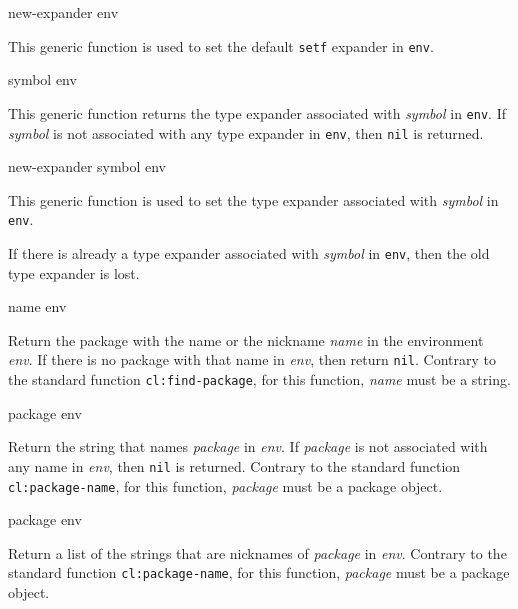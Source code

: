  {new-expander env}

This generic function is used to set the default \texttt{setf}
expander in \texttt{env}.

 {symbol env}

This generic function returns the type expander associated with
\textit{symbol} in \texttt{env}.  If \textit{symbol} is not associated
with any type expander in \texttt{env}, then \texttt{nil} is returned.

 {new-expander symbol env}

This generic function is used to set the type expander associated
with \textit{symbol} in \texttt{env}.

If there is already a type expander associated with \textit{symbol} in
\texttt{env}, then the old type expander is lost.

 {name env}

Return the package with the name or the nickname \textit{name} in the
environment \textit{env}.  If there is no package with that name
in \textit{env}, then return \texttt{nil}.  Contrary to
the standard \commonlisp{} function \texttt{cl:find-package}, for this
function, \textit{name} must be a string.

 {package env}

Return the string that names \textit{package} in \textit{env}.
If \textit{package} is not associated with any name in \textit{env},
then \texttt{nil} is returned.  Contrary to the standard \commonlisp{}
function \texttt{cl:package-name}, for this function, \textit{package}
must be a package object.

 {package env}

Return a list of the strings that are nicknames of \textit{package}
in \textit{env}.  Contrary to the standard \commonlisp{}
function \texttt{cl:package-name}, for this function, \textit{package}
must be a package object.
